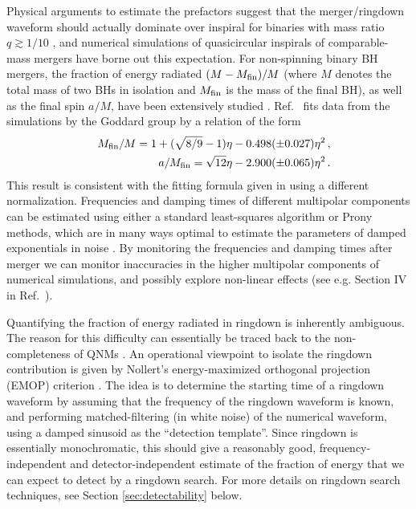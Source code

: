 \documentclass[]{iopart}
\def\beq{\begin{eqnarray}}
\def\eeq{\end{eqnarray}}
\begin{document}
Physical arguments to estimate the prefactors suggest that the merger/ringdown
waveform should actually dominate over inspiral for binaries with mass ratio
$q\gtrsim 1/10$ \cite{Flanagan:1997sx,Berti:2005ys}, and numerical simulations
of quasicircular inspirals of comparable-mass mergers have borne out this
expectation. For non-spinning binary BH mergers, the fraction of energy
radiated $(M-M_{\rm fin})/M$ (where $M$ denotes the total mass of two BHs in
isolation and $M_{\rm fin}$ is the mass of the final BH), as well as the final
spin $a/M$, have been extensively studied
\cite{Buonanno:2006ui,Berti:2007fi,Buonanno:2007pf,Baker:2008mj,Baker:2008mj}.
Ref.~\cite{Buonanno:2007pf} fits data from the simulations by the Goddard
group by a relation of the form
%
\beq
&&M_{\rm fin}/M=1+(\sqrt{8/9}-1)\eta-0.498(\pm 0.027)\eta^2\,,\\
&&a/M_{\rm fin}=\sqrt{12}\eta-2.900(\pm 0.065)\eta^2\,.
\eeq
%
This result is consistent with the fitting formula given in
\cite{Berti:2007fi} using a different normalization. Frequencies and damping
times of different multipolar components can be estimated using either a
standard least-squares algorithm \cite{Buonanno:2006ui} or Prony methods,
which are in many ways optimal to estimate the parameters of damped
exponentials in noise \cite{Berti:2007dg}. By monitoring the frequencies and
damping times after merger we can monitor inaccuracies in the higher
multipolar components of numerical simulations, and possibly explore
non-linear effects (see e.g. Section IV in Ref.~\cite{Berti:2007fi}).

Quantifying the fraction of energy radiated in ringdown is inherently
ambiguous. The reason for this difficulty can essentially be traced back to
the non-completeness of QNMs
\cite{nollertthesis,RevModPhys.70.1545,Nollert:1998ys,Berti:2007fi}.  An
operational viewpoint to isolate the ringdown contribution is given by
Nollert's energy-maximized orthogonal projection (EMOP) criterion
\cite{nollertthesis,Berti:2007fi}. The idea is to determine the starting time
of a ringdown waveform by assuming that the frequency of the ringdown waveform
is known, and performing matched-filtering (in white noise) of the numerical
waveform, using a damped sinusoid as the ``detection template''. Since
ringdown is essentially monochromatic, this should give a reasonably good,
frequency-independent and detector-independent estimate of the fraction of
energy that we can expect to detect by a ringdown search. For more details on
ringdown search techniques, see Section \ref{sec:detectability} below.
\end{document}
